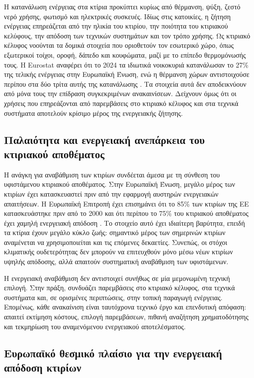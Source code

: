 Η κατανάλωση ενέργειας στα κτίρια προκύπτει κυρίως από θέρμανση, ψύξη, ζεστό
νερό χρήσης, φωτισμό και ηλεκτρικές συσκευές. Ιδίως στις κατοικίες, η ζήτηση
ενέργειας επηρεάζεται από την ηλικία του κτιρίου, την ποιότητα του κτιριακού
κελύφους, την απόδοση των τεχνικών συστημάτων και τον τρόπο χρήσης. Ως
κτιριακό κέλυφος νοούνται τα δομικά στοιχεία που οριοθετούν τον εσωτερικό
χώρο, όπως εξωτερικοί τοίχοι, οροφή, δάπεδο και κουφώματα, μαζί με το επίπεδο
θερμομόνωσής τους. Η Eurostat αναφέρει ότι το 2024 τα ιδιωτικά νοικοκυριά
κατανάλωσαν το
27\% της τελικής ενέργειας στην Ευρωπαϊκή Ένωση, ενώ η θέρμανση χώρων
αντιστοιχούσε περίπου στα δύο τρίτα αυτής της κατανάλωσης
\cite{eurostat_energy_2026}. Τα στοιχεία αυτά δεν αποδεικνύουν από μόνα τους
την επίδραση συγκεκριμένων ανακαινίσεων. Δείχνουν όμως ότι οι χρήσεις που
επηρεάζονται από παρεμβάσεις στο κτιριακό κέλυφος και στα τεχνικά συστήματα
αποτελούν κρίσιμο μέρος της ενεργειακής ζήτησης.

\subsection{Παλαιότητα και ενεργειακή ανεπάρκεια του κτιριακού αποθέματος}

Η ανάγκη για αναβάθμιση των κτιρίων συνδέεται άμεσα με τη σύνθεση του
υφιστάμενου κτιριακού αποθέματος. Στην Ευρωπαϊκή Ένωση, μεγάλο μέρος των
κτιρίων έχει κατασκευαστεί πριν από την εφαρμογή αυστηρών ενεργειακών απαιτήσεων.
Η Ευρωπαϊκή Επιτροπή έχει επισημάνει ότι το 85\% των κτιρίων της ΕΕ
κατασκευάστηκε πριν από το 2000 και ότι περίπου το 75\% του κτιριακού
αποθέματος έχει χαμηλή ενεργειακή απόδοση \cite{ec_epbd_news_2025}. Το στοιχείο
αυτό έχει ιδιαίτερη βαρύτητα, επειδή τα κτίρια έχουν μεγάλο κύκλο ζωής:
σημαντικό μέρος των σημερινών κτιρίων αναμένεται να χρησιμοποιείται και τις
επόμενες δεκαετίες. Συνεπώς, οι στόχοι κλιματικής ουδετερότητας δεν μπορούν
να επιτευχθούν μόνο μέσω νέων κτιρίων υψηλής απόδοσης, αλλά απαιτούν
συστηματική αναβάθμιση των υφιστάμενων.

Η ενεργειακή αναβάθμιση δεν αντιστοιχεί συνήθως σε μία μεμονωμένη τεχνική
επιλογή. Στην πράξη, συνδυάζει παρεμβάσεις στο κτιριακό κέλυφος, στα τεχνικά
συστήματα και, σε ορισμένες περιπτώσεις, στην τοπική παραγωγή ενέργειας. Επομένως, κάθε
ανακαίνιση είναι ταυτόχρονα τεχνικό έργο και επενδυτική απόφαση: απαιτεί
εκτίμηση κόστους, επιλογή παρεμβάσεων, πιθανή αναζήτηση χρηματοδότησης και
τεκμηρίωση του αναμενόμενου ενεργειακού αποτελέσματος.

\subsection{Ευρωπαϊκό θεσμικό πλαίσιο για την ενεργειακή απόδοση κτιρίων}

